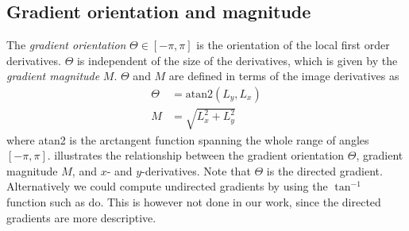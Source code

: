 \documentclass[thesis.tex]{subfiles}
\begin{document}
\subsection{Gradient orientation and magnitude}
\label{sec:gradientTheory}
%
The \emph{gradient orientation} $\Theta \in [-\pi,\pi]$ is the orientation of the local first order derivatives. $\Theta$ is independent of the size of the derivatives, which is given by the \emph{gradient magnitude} $M$. $\Theta$ and $M$ are defined in terms of the image derivatives as
%
\begin{align*}
\Theta &= \text{atan2}(L_y,L_x) \\
M &= \sqrt{L_x^2 + L_y^2}
\end{align*}
where atan2 is the arctangent function spanning the whole range of angles $[-\pi,\pi]$.
%
 illustrates the relationship between the gradient orientation $\Theta$, gradient magnitude $M$, and $x$- and $y$-derivatives. Note that $\Theta$ is the directed gradient. Alternatively we could compute undirected gradients by using the $\tan^{-1}$ function such as \citet{dalal2005histograms} do. This is however not done in our work, since the directed gradients are more descriptive.
%
\end{document}
